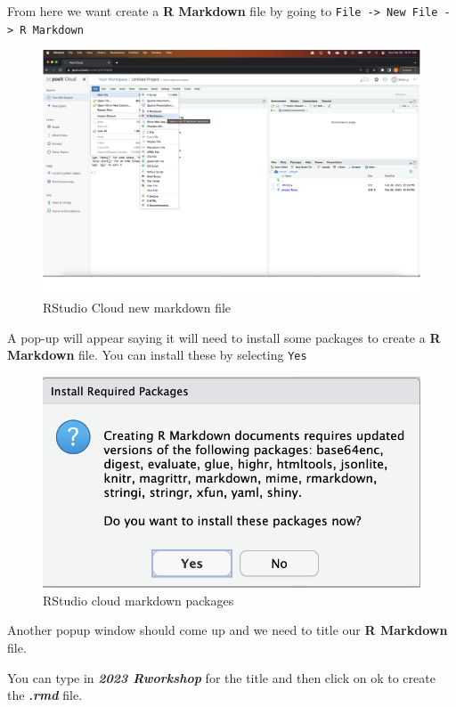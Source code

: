 \documentclass[
]{book}
\begin{document}
From here we want create a \textbf{R Markdown} file by going to \texttt{File\ -\textgreater{}\ New\ File\ -\textgreater{}\ R\ Markdown}

\begin{figure}
\includegraphics[width=50in]{images/2.8rmarkdowncloudnew} \caption{RStudio Cloud new markdown file}\label{fig:unnamed-chunk-11}
\end{figure}

A pop-up will appear saying it will need to install some packages to create a \textbf{R Markdown} file. You can install these by selecting \texttt{Yes}

\begin{figure}
\includegraphics[width=10.33in]{images/2.9rmarkdownpackages} \caption{RStudio cloud markdown packages}\label{fig:unnamed-chunk-12}
\end{figure}

Another popup window should come up and we need to title our \textbf{R Markdown} file.

You can type in \textbf{\emph{2023 Rworkshop}} for the title and then click on ok to create the \textbf{\emph{.rmd}} file.
\end{document}
